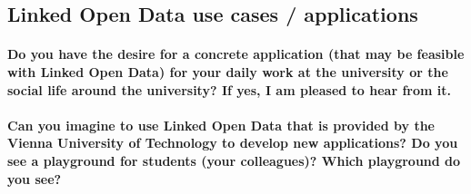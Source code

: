 \documentclass{article}
\begin{document}
\subsection{Linked Open Data use cases / applications}
\label{questionaire:lod-usecase-app}

\paragraph{Do you have the desire for a concrete application (that may be feasible with Linked Open Data) for your daily work at the university or the social life around the university? If yes, I am pleased to hear from it.}

\opentwo

\paragraph{Can you imagine to use Linked Open Data that is provided by the Vienna University of Technology to develop new applications? Do you see a playground for students (your colleagues)? Which playground do you see?}

\opentwo

\newpage



\end{document}
